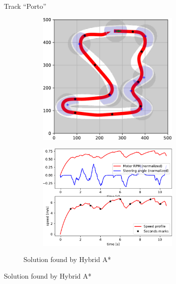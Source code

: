 \begin{figure}[!tbp]
	\vspace{0.75cm}
	
	\caption{Track ``Porto''}
\end{figure}


\begin{figure}[!tbp]%
	\centering
	
	\begin{subfigure}[t]{\textwidth}
		\begin{subfigure}[t]{0.45\textwidth}
			\includegraphics[width=\textwidth]{../img/experiments/tornado-hybrid_astar-trajectory}
		\end{subfigure}
		\hfill
		\begin{subfigure}[t]{0.45\textwidth}
			\includegraphics[width=\textwidth]{../img/experiments/tornado-hybrid_astar-actuators}
		\end{subfigure}
		\caption{Solution found by Hybrid A*}
		\label{fig:solution_tornado-hybrid_astar}	
	\end{subfigure}
	

\end{figure}
